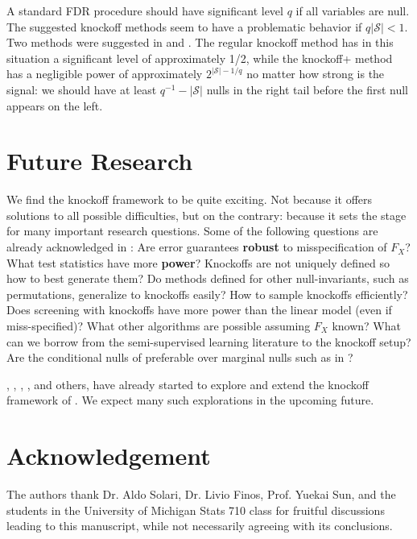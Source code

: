 \documentclass[article,lineno]{biometrika}
\begin{document}
	A standard FDR procedure should have significant level $q$ if all variables are null. The suggested knockoff methods seem to have a problematic behavior if $q|\mathcal{S}|<1$. Two methods were suggested in \citet{BarberControllingfalsediscovery2015} and \citet{CandesPanninggoldmodelX2018}. The regular knockoff method has in this situation a significant level of approximately 1/2, while the knockoff+ method has a negligible power of approximately $2^{|\mathcal{S}|-1/q}$ no matter how strong is the signal: we should have at least $q^{-1}-|\mathcal{S}|$ nulls in the right tail before the first null appears on the left.

	
	
	\section{Future Research}
	
	We find the knockoff framework to be quite exciting.
	Not because it offers solutions to all possible difficulties, but on the contrary: because it sets the stage for many important research questions.
	Some of the following questions are already acknowledged in \citet[Sec.7.2]{CandesPanninggoldmodelX2018}:
	Are error guarantees \textbf{robust} to misspecification of $F_X$?
	What test statistics have more \textbf{power}?
	Knockoffs are not uniquely defined so how to best generate them?
	Do methods defined for other null-invariants, such as permutations, generalize to knockoffs easily?
	How to sample knockoffs efficiently?
	Does screening with knockoffs have more power than the linear model (even if miss-specified)?
	What other algorithms are possible assuming $F_X$ known?
	What can we borrow from the semi-supervised learning literature to the knockoff setup?
	Are the conditional nulls of \cite{SesiaGenehuntinghidden} preferable over marginal nulls such as in \cite{TusherSignificanceanalysismicroarrays2001}?
	
	\cite{DaiknockofffilterFDR2016}, \cite{JansonFamilywiseerrorrate2016}, \cite{ChenAnalysisKnockoffFilter2017}, \cite{ChenPseudoKnockoffFilter2017}, and others, have already started to explore and extend the knockoff framework of \cite{BarberControllingfalsediscovery2015}.
	We expect many such explorations in the upcoming future.
	
	
	
	\section*{Acknowledgement}
	The authors thank  Dr. Aldo Solari, Dr. Livio Finos, Prof. Yuekai Sun, and the students in the University of Michigan Stats 710 class for fruitful discussions leading to this manuscript, while not necessarily agreeing with its conclusions.
	
	
	
	
	
	
	
\end{document}
